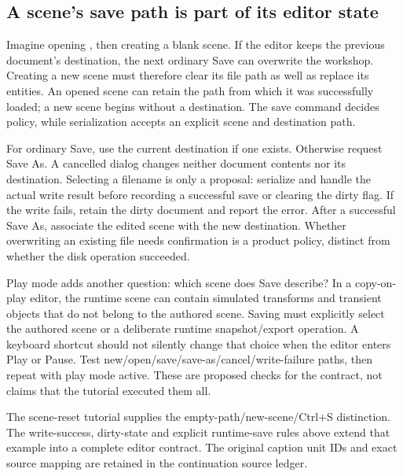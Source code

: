 \subsection{A scene's save path is part of its editor state}\label{06-engine-ii-ch046-a-scenes-save-path-is-part-of-its-editor-state}

\hypertarget{06-engine-ii-ch046-a-scenes-save-path-is-part-of-its-editor-state}{}

Imagine opening , then creating a blank scene. If the editor keeps the previous document's destination, the next ordinary Save can overwrite the workshop. Creating a new scene must therefore clear its file path as well as replace its entities. An opened scene can retain the path from which it was successfully loaded; a new scene begins without a destination. The save command decides policy, while serialization accepts an explicit scene and destination path.

For ordinary Save, use the current destination if one exists. Otherwise request Save As. A cancelled dialog changes neither document contents nor its destination. Selecting a filename is only a proposal: serialize and handle the actual write result before recording a successful save or clearing the dirty flag. If the write fails, retain the dirty document and report the error. After a successful Save As, associate the edited scene with the new destination. Whether overwriting an existing file needs confirmation is a product policy, distinct from whether the disk operation succeeded.

Play mode adds another question: which scene does Save describe? In a copy-on-play editor, the runtime scene can contain simulated transforms and transient objects that do not belong to the authored scene. Saving must explicitly select the authored scene or a deliberate runtime snapshot/export operation. A keyboard shortcut should not silently change that choice when the editor enters Play or Pause. Test new/open/save/save-as/cancel/write-failure paths, then repeat with play mode active. These are proposed checks for the contract, not claims that the tutorial executed them all.

The scene-reset tutorial supplies the empty-path/new-scene/Ctrl+S distinction. The write-success, dirty-state and explicit runtime-save rules above extend that example into a complete editor contract. The original caption unit IDs and exact source mapping are retained in the continuation source ledger.

